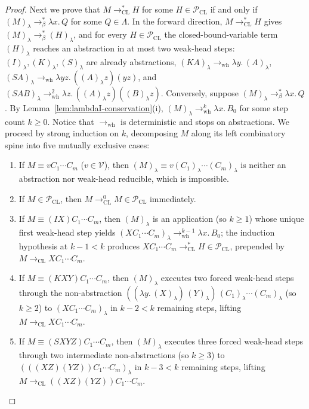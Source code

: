 \documentclass[11pt,reqno]{amsart}
\numberwithin{equation}{section}
\theoremstyle{plain}
\theoremstyle{definition}
\theoremstyle{remark}
\begin{document}
\begin{proof}
Next we prove that $M \to_{\mathrm{CL}}^* H$ for some $H \in \mathcal{P}_{\mathrm{CL}}$ if and only if $(M)_\lambda \to_\beta^* \lambda x.\, Q$ for some $Q \in \Lambda$. In the forward direction, $M \to_{\mathrm{CL}}^* H$ gives $(M)_\lambda \to_\beta^* (H)_\lambda$, and for every $H \in \mathcal{P}_{\mathrm{CL}}$ the closed-bound-variable term $(H)_\lambda$ reaches an abstraction in at most two weak-head steps: $(I)_\lambda, (K)_\lambda, (S)_\lambda$ are already abstractions, $(K A)_\lambda \to_{\mathrm{wh}} \lambda y.\, (A)_\lambda$, $(S A)_\lambda \to_{\mathrm{wh}} \lambda y z.\, ((A)_\lambda z)(y z)$, and $(S A B)_\lambda \to_{\mathrm{wh}}^2 \lambda z.\, ((A)_\lambda z)((B)_\lambda z)$. Conversely, suppose $(M)_\lambda \to_\beta^* \lambda x.\, Q$. By Lemma~\ref{lem:lambdaI-conservation}(i), $(M)_\lambda \to_{\mathrm{wh}}^k \lambda x.\, B_0$ for some step count $k \ge 0$. Notice that $\to_{\mathrm{wh}}$ is deterministic and stops on abstractions. We proceed by strong induction on $k$, decomposing $M$ along its left combinatory spine into five mutually exclusive cases:
\begin{enumerate}[label=(\arabic*),leftmargin=2.0em]
  \item If $M \equiv v C_1 \cdots C_m$ ($v \in \mathcal{V}$), then $(M)_\lambda \equiv v (C_1)_\lambda \cdots (C_m)_\lambda$ is neither an abstraction nor weak-head reducible, which is impossible.
  \item If $M \in \mathcal{P}_{\mathrm{CL}}$, then $M \to_{\mathrm{CL}}^0 M \in \mathcal{P}_{\mathrm{CL}}$ immediately.
  \item If $M \equiv (I X) C_1 \cdots C_m$, then $(M)_\lambda$ is an application (so $k \ge 1$) whose unique first weak-head step yields $(X C_1 \cdots C_m)_\lambda \to_{\mathrm{wh}}^{k-1} \lambda x.\, B_0$; the induction hypothesis at $k - 1 < k$ produces $X C_1 \cdots C_m \to_{\mathrm{CL}}^* H \in \mathcal{P}_{\mathrm{CL}}$, prepended by $M \to_{\mathrm{CL}} X C_1 \cdots C_m$.
  \item If $M \equiv (K X Y) C_1 \cdots C_m$, then $(M)_\lambda$ executes two forced weak-head steps through the non-abstraction $((\lambda y.\, (X)_\lambda)\,(Y)_\lambda)\,(C_1)_\lambda \cdots (C_m)_\lambda$ (so $k \ge 2$) to $(X C_1 \cdots C_m)_\lambda$ in $k - 2 < k$ remaining steps, lifting $M \to_{\mathrm{CL}} X C_1 \cdots C_m$.
  \item If $M \equiv (S X Y Z) C_1 \cdots C_m$, then $(M)_\lambda$ executes three forced weak-head steps through two intermediate non-abstractions (so $k \ge 3$) to $(((X Z)(Y Z)) C_1 \cdots C_m)_\lambda$ in $k - 3 < k$ remaining steps, lifting $M \to_{\mathrm{CL}} ((X Z)(Y Z)) C_1 \cdots C_m$.
\end{enumerate}


\end{proof}
\end{document}
